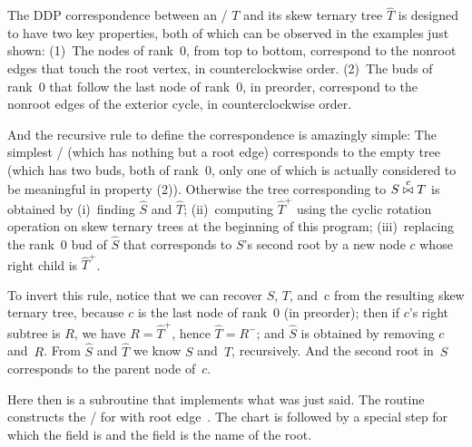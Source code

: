 \fi

The DDP correspondence between an \RNBPM/ $T$
and its
skew ternary tree $\widehat T$ is designed to have
two key properties, both of which can be observed in
the examples just shown: (1)~The nodes of rank~0, from top to bottom,
correspond to the nonroot edges that touch the root vertex, in
counterclockwise order. (2)~The buds of
rank~0 that follow the last node of rank~0, in preorder,
correspond to the nonroot edges of the exterior cycle, in counterclockwise
order.

And the recursive rule to define the correspondence is amazingly simple:
The simplest \RNBPM/ (which has nothing but a root edge) corresponds to the
empty tree (which has two buds, both of rank~0, only one of which is actually
considered to be meaningful in property (2)).
Otherwise the tree corresponding to $S\join c T$ is obtained by
(i)~finding $\widehat S$ and $\widehat T$;
(ii)~computing $\widehat T^+$ using the cyclic rotation operation
on skew ternary trees at the beginning of this program;
(iii)~replacing the rank~0 bud of $\widehat S$ that
corresponds to $S$'s second root by a new node $c$ whose right
child is $\widehat T^+$.

To invert this rule, notice that we can recover $S$, $T$, and~c
from the resulting skew ternary tree, because $c$ is the last
node of rank~0 (in preorder); then if $c$'s right subtree is
$R$, we have $R=\widehat T^+$, hence $\widehat T=R^-$; and $\widehat S$ is
obtained by removing $c$ and~$R$. From $\widehat S$ and $\widehat T$
we know $S$ and~$T$, recursively. And the second root
in~$S$ corresponds to the parent node of~$c$.

\fi

Here then is a subroutine that implements what
was just said.
The  routine constructs the
\RNBPM/ for 
with root edge~. The chart is followed by a special step
for which the  field is  and the 
field
is the name of the root.

